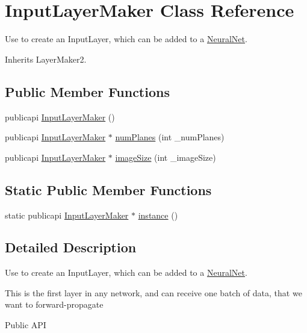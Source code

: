 \hypertarget{classInputLayerMaker}{\section{Input\-Layer\-Maker Class Reference}
\label{classInputLayerMaker}
}


Use to create an Input\-Layer, which can be added to a \hyperlink{classNeuralNet}{Neural\-Net}.  




Inherits Layer\-Maker2.

\subsection*{Public Member Functions}
\begin{DoxyCompactItemize}
\item 
publicapi \hyperlink{classInputLayerMaker_ab07f09c59b8f3b376c473310f25a5f5a}{Input\-Layer\-Maker} ()
\item 
publicapi \hyperlink{classInputLayerMaker}{Input\-Layer\-Maker} $\ast$ \hyperlink{classInputLayerMaker_a4bcf4ddea0f4b3bf9061a5f1866ced42}{num\-Planes} (int \-\_\-num\-Planes)
\item 
publicapi \hyperlink{classInputLayerMaker}{Input\-Layer\-Maker} $\ast$ \hyperlink{classInputLayerMaker_a0be24032966f868c1bcd86291ad141ba}{image\-Size} (int \-\_\-image\-Size)
\end{DoxyCompactItemize}
\subsection*{Static Public Member Functions}
\begin{DoxyCompactItemize}
\item 
static publicapi \hyperlink{classInputLayerMaker}{Input\-Layer\-Maker} $\ast$ \hyperlink{classInputLayerMaker_a5f929cc46beba91c7ffe8c50ba812531}{instance} ()
\end{DoxyCompactItemize}


\subsection{Detailed Description}
Use to create an Input\-Layer, which can be added to a \hyperlink{classNeuralNet}{Neural\-Net}. 

This is the first layer in any network, and can receive one batch of data, that we want to forward-\/propagate \begin{DoxyParagraph}{Public A\-P\-I}

\end{DoxyParagraph}


